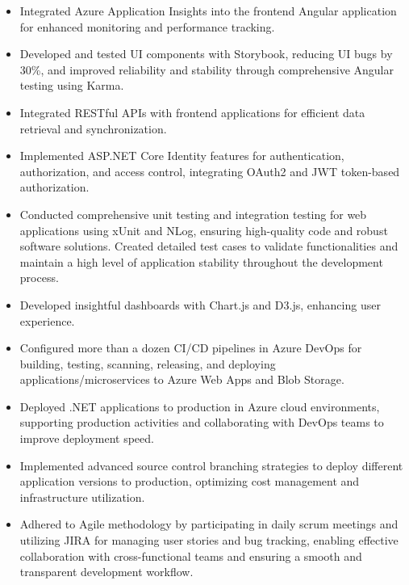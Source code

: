 \documentclass{article}
\begin{document}
\begin{itemize}[leftmargin=15pt, itemsep=-5pt]
    \item Integrated Azure Application Insights into the frontend Angular application for enhanced monitoring and performance tracking.
    \item Developed and tested UI components with Storybook, reducing UI bugs by 30\%, and improved reliability and stability through comprehensive Angular testing using Karma.
    \item Integrated RESTful APIs with frontend applications for efficient data retrieval and synchronization.
    \item Implemented ASP.NET Core Identity features for authentication, authorization, and access control, integrating OAuth2 and JWT token-based authorization.
    \item Conducted comprehensive unit testing and integration testing for web applications using xUnit and NLog, ensuring high-quality code and robust software solutions. Created detailed test cases to validate functionalities and maintain a high level of application stability throughout the development process.
    \item Developed insightful dashboards with Chart.js and D3.js, enhancing user experience.
    \item Configured more than a dozen CI/CD pipelines in Azure DevOps for building, testing, scanning, releasing, and deploying applications/microservices to Azure Web Apps and Blob Storage.
    \item Deployed .NET applications to production in Azure cloud environments, supporting production activities and collaborating with DevOps teams to improve deployment speed.
    \item Implemented advanced source control branching strategies to deploy different application versions to production, optimizing cost management and infrastructure utilization.
    \item Adhered to Agile methodology by participating in daily scrum meetings and utilizing JIRA for managing user stories and bug tracking, enabling effective collaboration with cross-functional teams and ensuring a smooth and transparent development workflow.
\end{itemize}
\end{document}
